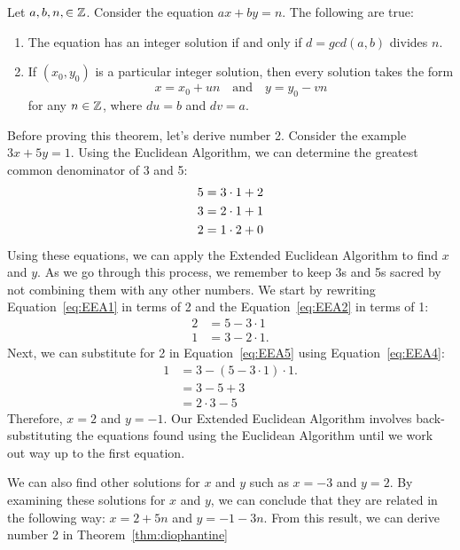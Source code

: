 \begin{theorem}\label{thm:diophantine}
Let $a, b, n, \in \mathbb{Z}$. Consider the equation $ax + by = n$. The following are true:
\begin{enumerate}
\item The equation has an integer solution if and only if $d = gcd(a,b)$ divides $n$.
\item If $(x_0,y_0)$ is a particular integer solution, then every solution takes the form \[x = x_0 + un \quad \text{and} \quad y = y_0 - vn\] for any $n \in \mathbb{Z}$, where $du = b$ and $dv = a$. 
\end{enumerate}
\end{theorem}
Before proving this theorem, let's derive number 2. Consider the example $3x + 5y = 1$. Using the Euclidean Algorithm, we can determine the greatest common denominator of 3 and 5:
\begin{align}
5 &= 3 \cdot 1 + 2 \label{eq:EEA1}\\
3 &= 2 \cdot 1 + 1 \label{eq:EEA2}\\
2 &= 1 \cdot 2 + 0 \notag
\end{align}
Using these equations, we can apply the Extended Euclidean Algorithm to find $x$ and $y$. As we go through this process, we remember to keep 3s and 5s sacred by not combining them with any other numbers. We start by rewriting Equation~\eqref{eq:EEA1} in terms of 2 and the Equation~\eqref{eq:EEA2} in terms of 1: 
\begin{align}
2 &= 5 - 3 \cdot 1 \label{eq:EEA4}\\
1 &= 3 - 2 \cdot 1. \label{eq:EEA5} 
\end{align}
Next, we can substitute for 2 in Equation~\eqref{eq:EEA5} using Equation~\eqref{eq:EEA4}:
\begin{align}
1 &= 3 - (5 - 3 \cdot 1) \cdot 1. \\
  &= 3 - 5 + 3 \\ 
  &= 2 \cdot 3 - 5
\end{align}
Therefore, $x=2$ and $y=-1$. Our Extended Euclidean Algorithm involves back-substituting the equations found using the Euclidean Algorithm until we work out way up to the first equation.

We can also find other solutions for $x$ and $y$ such as $x = -3$ and $y = 2$. By examining these solutions for $x$ and $y$, we can conclude that they are related in the following way: $x = 2 + 5n$ and $y = -1 - 3n$. From this result, we can derive number 2 in Theorem~\ref{thm:diophantine}